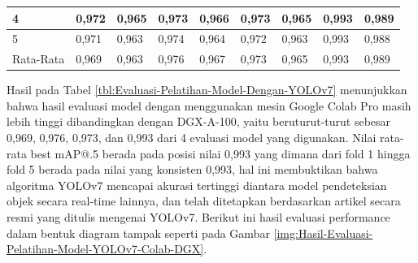 \begin{singlespace}
\begin{table}[H]
\begin{tabular}{|p{1cm}|p{1cm}p{1cm}|p{1cm}p{1cm}|p{1cm}p{1cm}|p{1cm}p{1cm}|}
			4                                              & \multicolumn{1}{p{1cm}|}{0,972}                                    & 0,965     & \multicolumn{1}{p{1cm}|}{0,973}                                    & 0,966     & \multicolumn{1}{p{1cm}|}{0,973}                                    & 0,965     & \multicolumn{1}{p{1cm}|}{0,993}                                     & 0,989     \\ \hline
			
			5                                              & \multicolumn{1}{p{1cm}|}{0,971}                                    & 0,963     & \multicolumn{1}{p{1cm}|}{0,974}                                    & 0,964     & \multicolumn{1}{p{1cm}|}{0,972}                                    & 0,963     & \multicolumn{1}{p{1cm}|}{0,993}                                     & 0,988     \\ \hline
			
			Rata-Rata                                      & \multicolumn{1}{p{1cm}|}{0,969}                                    & 0,963     & \multicolumn{1}{p{1cm}|}{0,976}                                    & 0,967     & \multicolumn{1}{p{1cm}|}{0,973}                                    & 0,965     & \multicolumn{1}{p{1cm}|}{0,993}                                     & 0,989     \\ \hline
			
		\end{tabular}
	\end{table}
\end{singlespace}

Hasil pada Tabel \ref{tbl:Evaluasi-Pelatihan-Model-Dengan-YOLOv7} menunjukkan bahwa hasil evaluasi model dengan menggunakan mesin Google Colab Pro masih lebih tinggi dibandingkan dengan DGX-A-100, yaitu beruturut-turut sebesar 0,969, 0,976, 0,973, dan 0,993 dari 4 evaluasi model yang digunakan. Nilai rata-rata best mAP@.5 berada pada posisi nilai 0,993 yang dimana dari fold 1 hingga fold 5 berada pada nilai yang konsisten 0,993, hal ini membuktikan bahwa algoritma YOLOv7 mencapai akurasi tertinggi diantara model pendeteksian objek secara real-time lainnya, dan telah ditetapkan berdasarkan artikel secara resmi yang ditulis mengenai YOLOv7. Berikut ini hasil evaluasi performance dalam bentuk diagram tampak seperti pada Gambar \ref{img:Hasil-Evaluasi-Pelatihan-Model-YOLOv7-Colab-DGX}.

